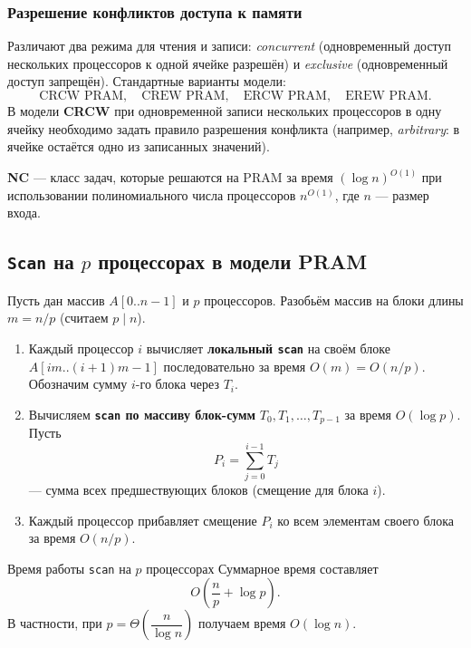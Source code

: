 \subsubsection*{Разрешение конфликтов доступа к памяти}

Различают два режима для чтения и записи: \emph{concurrent} (одновременный доступ нескольких процессоров к одной ячейке разрешён) и \emph{exclusive} (одновременный доступ запрещён). Стандартные варианты модели:
\[
\text{CRCW PRAM}, \quad \text{CREW PRAM}, \quad \text{ERCW PRAM}, \quad \text{EREW PRAM}.
\]
В модели \textbf{CRCW} при одновременной записи нескольких процессоров в одну ячейку необходимо задать правило разрешения конфликта (например, \emph{arbitrary}: в ячейке остаётся одно из записанных значений).

\begin{Definition}{}{}
	\textbf{NC} — класс задач, которые решаются на PRAM за время $(\log n)^{O(1)}$ при использовании полиномиального числа процессоров $n^{O(1)}$, где $n$ — размер входа.
\end{Definition}

\subsection{\texttt{Scan} на $p$ процессорах в модели PRAM}

Пусть дан массив $A[0..n-1]$ и $p$ процессоров. Разобьём массив на блоки длины $m = n/p$ (считаем $p \mid n$).

\begin{enumerate}
	\item Каждый процессор $i$ вычисляет \textbf{локальный \texttt{scan}} на своём блоке $A[im..(i+1)m-1]$ последовательно за время $O(m) = O(n/p)$. Обозначим сумму $i$-го блока через $T_i$.
	
	\item Вычисляем \textbf{\texttt{scan} по массиву блок-сумм} $T_0, T_1, \dots, T_{p-1}$ за время $O(\log p)$. Пусть
	\[
	P_i = \sum_{j=0}^{i-1} T_j
	\]
	— сумма всех предшествующих блоков (смещение для блока $i$).
	
	\item Каждый процессор прибавляет смещение $P_i$ ко всем элементам своего блока за время $O(n/p)$.
\end{enumerate}

\begin{Statement}{Время работы \texttt{scan} на $p$ процессорах}{}
	Суммарное время составляет
	\[
	O\!\left(\frac{n}{p} + \log p\right).
	\]
	В частности, при $p = \Theta\!\left(\dfrac{n}{\log n}\right)$ получаем время $O(\log n)$.
\end{Statement}

